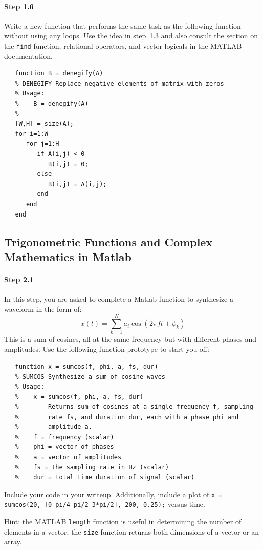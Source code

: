 \paragraph{Step 1.6} Write a new function that performs the same task
as the following function without using any loops. Use the idea in
step~1.3 and also consult the section on the \verb|find| function,
relational operators, and vector logicals in the MATLAB documentation.
\begin{verbatim}
   function B = denegify(A)
   % DENEGIFY Replace negative elements of matrix with zeros
   % Usage:
   %    B = denegify(A)
   %
   [W,H] = size(A);
   for i=1:W
      for j=1:H
         if A(i,j) < 0
            B(i,j) = 0;
         else
            B(i,j) = A(i,j);
         end
      end
   end
\end{verbatim}


\subsection{Trigonometric Functions and Complex Mathematics in Matlab}


\paragraph{Step 2.1} In this step, you are asked to complete a Matlab
function to synthesize a waveform in the form of:
\begin{equation*}
x(t) = \sum_{k=1}^N a_i\cos(2\pi f t + \phi_k)
\end{equation*}
This is a sum of cosines, all at the same frequency but with different
phases and amplitudes.  Use the following function prototype to start you off:
\begin{verbatim}
   function x = sumcos(f, phi, a, fs, dur)
   % SUMCOS Synthesize a sum of cosine waves
   % Usage:
   %    x = sumcos(f, phi, a, fs, dur)
   %        Returns sum of cosines at a single frequency f, sampling
   %        rate fs, and duration dur, each with a phase phi and
   %        amplitude a.
   %    f = frequency (scalar)
   %    phi = vector of phases
   %    a = vector of amplitudes
   %    fs = the sampling rate in Hz (scalar)
   %    dur = total time duration of signal (scalar)
\end{verbatim}

Include your code in your writeup. Additionally, include a plot of
\texttt{x = sumcos(20, [0 pi/4 pi/2 3*pi/2], 200, 0.25);} versus
time.

Hint: the MATLAB \verb|length| function is useful in determining the
number of elements in a vector; the \verb|size| function returns both
dimensions of a vector or an array.


